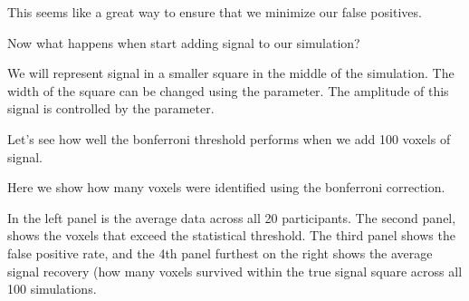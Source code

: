 \documentclass[letterpaper,10pt,english]{sphinxmanual}
\begin{document}
\noindent{}

This seems like a great way to ensure that we minimize our false positives.

Now what happens when start adding signal to our simulation?

We will represent signal in a smaller square in the middle of the simulation. The width of the square can be changed using the  parameter. The amplitude of this signal is controlled by the  parameter.

Let’s see how well the bonferroni threshold performs when we add 100 voxels of signal.

\begin{sphinxVerbatim}[commandchars=\\\{\}]
  
  
  
  

     
  
\end{sphinxVerbatim}

\noindent{}

Here we show how many voxels were identified using the bonferroni correction.

In the left panel is the average data across all 20 participants. The second panel, shows the voxels that exceed the statistical threshold. The third panel shows the false positive rate, and the 4th panel furthest on the right shows the average signal recovery (how many voxels survived within the true signal square across all 100 simulations.
\end{document}
